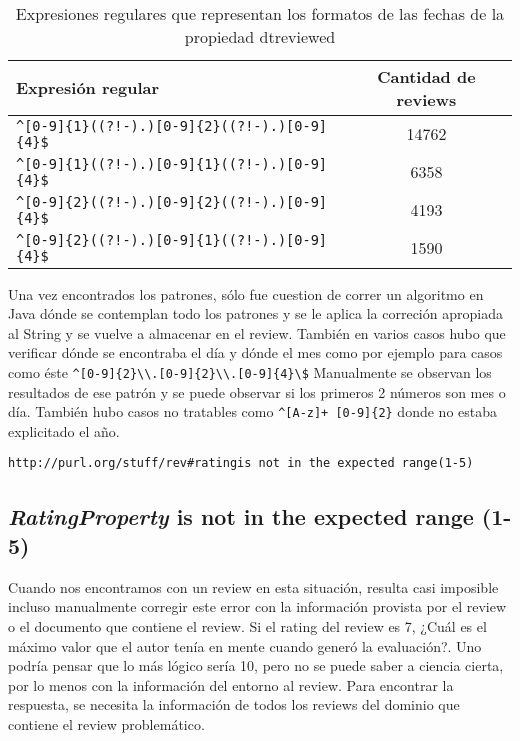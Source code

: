\\
\begin{table}[h]
\begin{tabular}{| l | c |}\hline
Expresión regular & Cantidad de reviews\\\hline
\verb|^[0-9]{1}((?!-).)[0-9]{2}((?!-).)[0-9]{4}$| & 14762\\
\verb|^[0-9]{1}((?!-).)[0-9]{1}((?!-).)[0-9]{4}$| & 6358\\
\verb|^[0-9]{2}((?!-).)[0-9]{2}((?!-).)[0-9]{4}$| & 4193\\
\verb|^[0-9]{2}((?!-).)[0-9]{1}((?!-).)[0-9]{4}$| & 1590\\\hline
\end{tabular}
\caption{Expresiones regulares que representan los formatos de las fechas de la propiedad  dtreviewed}
\label{table:RegExpressionsDtreviewed}
\end{table}

Una vez encontrados los patrones, sólo fue cuestion de correr un algoritmo en Java dónde se contemplan todo los patrones y se 
le aplica la correción apropiada al String y se vuelve a almacenar en el review.
También en varios casos hubo que verificar dónde se encontraba el día y dónde el mes como por ejemplo para casos como éste 
\verb|^[0-9]{2}\\.[0-9]{2}\\.[0-9]{4}\$|
Manualmente se observan los resultados de ese patrón y se puede observar si los primeros 2 números son mes o día.
También hubo casos no tratables como \verb|^[A-z]+ [0-9]{2}| donde no estaba explicitado el año.

\noindent\verb|http://purl.org/stuff/rev#ratingis not in the expected range(1-5)|\\


\subsection*{\textit{RatingProperty} is not in the expected range (1-5)}
Cuando nos encontramos con un review en esta situación, resulta casi imposible incluso manualmente corregir este error con la información 
provista por el review o el documento que contiene el review. Si el rating del review es 7, ¿Cuál es el máximo valor que el autor tenía en mente cuando  
generó la evaluación?. Uno podría pensar que lo más lógico sería 10, pero no se puede saber a ciencia cierta, por lo menos con la información del entorno al review.
Para encontrar la respuesta, se necesita la información de todos los reviews del dominio que contiene el review problemático. 

